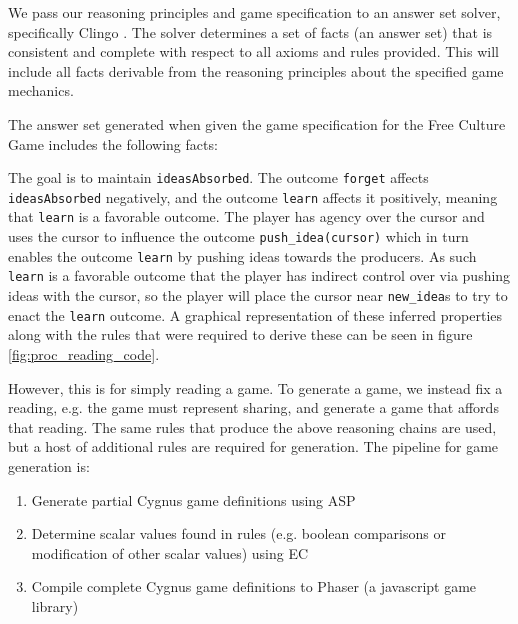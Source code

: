 \documentclass[12pt]{report}
\begin{document}

We pass our reasoning principles and game specification to an answer set
solver, specifically Clingo \cite{clingo}. The solver determines a set of
facts (an answer set) that is consistent and complete with respect to all
axioms and rules provided. This will include all facts derivable from the reasoning principles about the specified game mechanics.

The answer set generated when given the game specification for the Free
Culture Game includes the following facts:

The goal is to maintain \verb|ideasAbsorbed|. The outcome  \verb|forget|
affects \verb|ideasAbsorbed| negatively, and the outcome \verb|learn|
affects it positively, meaning that \verb|learn| is a favorable outcome.
The player has agency over the cursor and uses the cursor to influence the
outcome \verb|push_idea(cursor)| which in turn enables the outcome
\verb|learn| by pushing ideas towards the producers.  As such \verb|learn|
is a favorable outcome that the player has indirect control over via
pushing ideas with the cursor, so the player will place the cursor  near
\verb|new_idea|s to try to enact the \verb|learn| outcome.  A graphical representation of these inferred properties along with the rules that were required to derive these can be seen in figure \ref{fig:proc_reading_code}.

However, this is for simply reading a game.  To generate a game, we instead fix a reading, e.g. the game must represent sharing, and generate a game that affords that reading.  The same rules that produce the above reasoning chains are used, but a host of additional rules are required for generation.  The pipeline for game generation is:


\begin{enumerate}
\item Generate partial Cygnus game definitions using ASP
\item Determine scalar values found in rules (e.g. boolean comparisons or modification of other scalar values) using EC
\item Compile complete Cygnus game definitions to Phaser (a javascript game library)
\end{enumerate}
\end{document}

